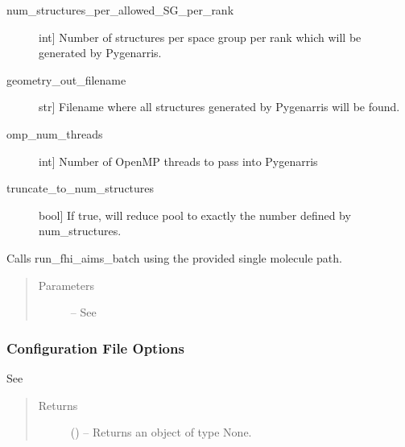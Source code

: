\documentclass[letterpaper,10pt,english]{sphinxmanual}
\begin{document}
\begin{fulllineitems}
\begin{fulllineitems}
\begin{description}
\item[{num\_structures\_per\_allowed\_SG\_per\_rank}] \leavevmode{[}int{]}
Number of structures per space group per rank which will be
generated by Pygenarris.

\item[{geometry\_out\_filename}] \leavevmode{[}str{]}
Filename where all structures generated by Pygenarris will be found.

\item[{omp\_num\_threads}] \leavevmode{[}int{]}
Number of OpenMP threads to pass into Pygenarris

\item[{truncate\_to\_num\_structures}] \leavevmode{[}bool{]}
If true, will reduce pool to exactly the number defined by
num\_structures.

\end{description}

\end{fulllineitems}


\begin{fulllineitems}
\label{\detokenize{index:Genarris.genarris_master.Genarris.Relax_Single_Molecule}}
Calls run\_fhi\_aims\_batch using the provided single molecule path.
\begin{quote}\begin{description}
\item[{Parameters}] \leavevmode
{} -- See {\hyperref[\detokenize{index:Genarris.genarris_master.Genarris.Run_FHI_Aims_Batch}]{}}

\end{description}\end{quote}
\subsubsection*{Configuration File Options}

See {\hyperref[\detokenize{index:Genarris.genarris_master.Genarris.Run_FHI_Aims_Batch}]{}}
\begin{quote}\begin{description}
\item[{Returns}] \leavevmode
{} () -- Returns an object of type None.


\end{description}
\end{quote}
\end{fulllineitems}
\end{fulllineitems}
\end{document}
